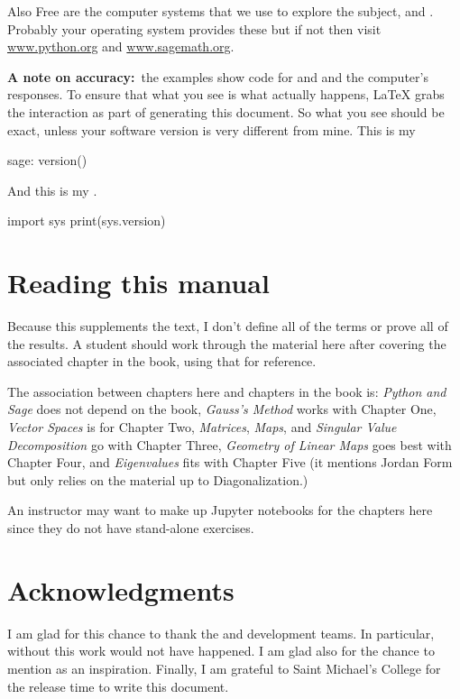 Also Free are the computer systems that we use to explore the subject,
\python{} and \Sage{}.
Probably your operating system provides these but if not then visit 
\href{http://www.python.org}{\url{www.python.org}}
and 
\href{https://www.sagemath.org}{\url{www.sagemath.org}}.

\textbf{A note on accuracy:}~the examples 
show code for \python{} and \Sage{} and the computer's responses.
To ensure that what you see is what actually happens,
\LaTeX{} grabs the interaction as part of generating this document.  
So what you see should be exact,
unless your software version is very different from mine.
This is my \Sage
\begin{sagecommandline}
sage: version()  
\end{sagecommandline}
And this is my \python{}. 
\begin{pythonconsole}
import sys
print(sys.version)
\end{pythonconsole}




\section{Reading this manual}
Because this supplements the text, 
I don't define all of the terms or prove all of the results.
A student should work through the material here after covering the associated
chapter in the book, using that for reference.

The association between chapters here and chapters in the book is:
\textit{Python and Sage} does not depend on the
book,
\textit{Gauss’s Method} works with Chapter One,
\textit{Vector Spaces} is for Chapter Two,
\textit{Matrices}, 
\textit{Maps}, and 
\textit{Singular Value Decomposition} go with Chapter Three,
\textit{Geometry of Linear Maps} goes best with Chapter Four,
and \textit{Eigenvalues} fits with Chapter Five
(it mentions Jordan Form but only relies on the material up to 
Diagonalization.)

An instructor may want to make up Jupyter notebooks for the chapters here
since they do not have stand-alone exercises.




\section{Acknowledgments}
I am glad for this chance to thank the \python{} and
\Sage{} development teams.
In particular,
without \citep{SageTeam12ref} this work would not have happened.
I am glad also for the chance to mention 
\citep{Beezer11} as an inspiration.
Finally, I am grateful to Saint Michael's College for the 
release time to write this document.





